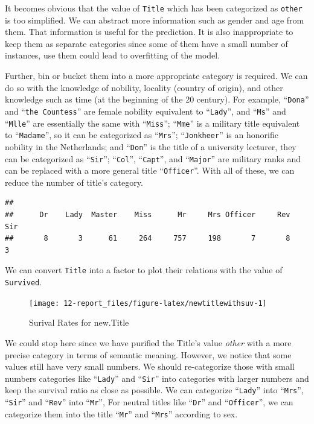 \documentclass[
]{book}
\begin{document}
It becomes obvious that the value of \texttt{Title} which has been categorized as \texttt{other} is too simplified. We can abstract more information such as gender and age from them. That information is useful for the prediction. It is also inappropriate to keep them as separate categories since some of them have a small number of instances, use them could lead to overfitting of the model.

Further, bin or bucket them into a more appropriate category is required. We can do so with the knowledge of nobility, locality (country of origin), and other knowledge such as time (at the beginning of the 20 century). For example, ``\texttt{Dona}'' and ``\texttt{the\ Countess}'' are female nobility equivalent to ``\texttt{Lady}'', and ``\texttt{Ms}'' and ``\texttt{Mlle}'' are essentially the same with ``\texttt{Miss}''; ``\texttt{Mme}'' is a military title equivalent to ``\texttt{Madame}'', so it can be categorized as ``\texttt{Mrs}''; ``\texttt{Jonkheer}'' is an honorific nobility in the Netherlands; and ``\texttt{Don}'' is the title of a university lecturer, they can be categorized as ``\texttt{Sir}''; ``\texttt{Col}'', ``\texttt{Capt}'', and ``\texttt{Major}'' are military ranks and can be replaced with a more general title ``\texttt{Officer}''. With all of these, we can reduce the number of title's category.

\begin{verbatim}
## 
##      Dr    Lady  Master    Miss      Mr     Mrs Officer     Rev     Sir 
##       8       3      61     264     757     198       7       8       3
\end{verbatim}

We can convert \texttt{Title} into a factor to plot their relations with the value of \texttt{Survived}.

\begin{figure}

{\centering \texttt{[image: 12-report\_files/figure-latex/newtitlewithsuv-1]} 

}

\caption{Surival Rates for new.Title}\label{fig:newtitlewithsuv}
\end{figure}

We could stop here since we have purified the Title's value \emph{other} with a more precise category in terms of semantic meaning. However, we notice that some values still have very small numbers. We should re-categorize those with small numbers categories like ``\texttt{Lady}'' and ``\texttt{Sir}'' into categories with larger numbers and keep the survival ratio as close as possible. We can categorize ``\texttt{Lady}'' into ``\texttt{Mrs}'', ``\texttt{Sir}'' and ``\texttt{Rev}'' into ``\texttt{Mr}'', For neutral titles like ``\texttt{Dr}'' and ``\texttt{Officer}'', we can categorize them into the title ``\texttt{Mr}'' and ``\texttt{Mrs}'' according to sex.
\end{document}
